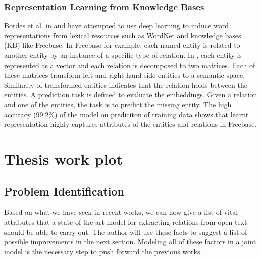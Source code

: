 \documentclass[12pt]{report}
\begin{document}
\subsection{Representation Learning from Knowledge Bases}
\label{subsec:structured-embedding}

Bordes et al. in \cite{Bordes2011} and \cite{Bordes2012} have attempted to use
deep learning to induce word representations from lexical resources such as
WordNet and knowledge bases (KB) like Freebase. In Freebase for example, each named entity is related
to another entity by an instance of a specific type of relation. In
\cite{Bordes2011}, each entity is represented as a vector and each relation is decomposed to two
matrices. Each of these matrices transform left and right-hand-side entities
to a semantic space. Similarity of transformed entities indicates that the
relation holds between the entities.  A prediction task is defined to evaluate
the embeddings. Given a relation and one of the entities, the task is to predict
the missing entity. The high accuracy (99.2\%) of the model on prediciton
of training data shows that learnt representation highly captures attributes of
the entities and relations in Freebase.




\chapter{Thesis work plot}
\label{ch:work-plot}

\section{Problem Identification}
\label{sec:prob-id}

Based on what we have seen in recent works, we can now give a list of vital
attributes that a state-of-the-art model for extracting relations from open text
should be able to carry out. The author will use these facts to suggest a list of possible improvements
in the next section. Modeling all of
these factors in a joint model is the necessary step to push forward the previous
works.
\end{document}
